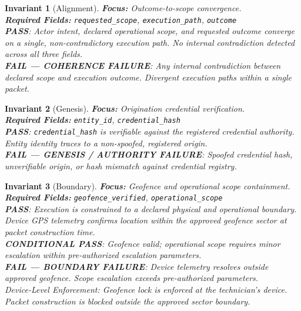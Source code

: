 \documentclass[11pt]{article}
\theoremstyle{invariantstyle}
\newtheorem{invariant}{Invariant}
\theoremstyle{defstyle}
\newcommand{\PASS}{\textcolor{passgreen}{\textbf{PASS}}}
\newcommand{\CPASS}{\textcolor{condyellow}{\textbf{CONDITIONAL PASS}}}
\newcommand{\FAIL}[1]{\textcolor{failred}{\textbf{FAIL — #1}}}
\begin{document}
\begin{invariant}[Alignment]
\textbf{Focus:} Outcome-to-scope convergence.\\
\textbf{Required Fields:} \texttt{requested\_scope}, \texttt{execution\_path},
\texttt{outcome}\\[4pt]
\PASS: Actor intent, declared operational scope, and requested outcome
converge on a single, non-contradictory execution path. No internal
contradiction detected across all three fields.\\[2pt]
\FAIL{COHERENCE FAILURE}: Any internal contradiction between declared
scope and execution outcome. Divergent execution paths within a
single packet.
\end{invariant}

\begin{invariant}[Genesis]
\textbf{Focus:} Origination credential verification.\\
\textbf{Required Fields:} \texttt{entity\_id}, \texttt{credential\_hash}\\[4pt]
\PASS: \texttt{credential\_hash} is verifiable against the registered
credential authority. Entity identity traces to a non-spoofed,
registered origin.\\[2pt]
\FAIL{GENESIS / AUTHORITY FAILURE}: Spoofed credential hash,
unverifiable origin, or hash mismatch against credential registry.
\end{invariant}

\begin{invariant}[Boundary]
\textbf{Focus:} Geofence and operational scope containment.\\
\textbf{Required Fields:} \texttt{geofence\_verified}, \texttt{operational\_scope}\\[4pt]
\PASS: Execution is constrained to a declared physical and operational
boundary. Device GPS telemetry confirms location within the approved
geofence sector at packet construction time.\\[2pt]
\CPASS: Geofence valid; operational scope requires minor escalation
within pre-authorized escalation parameters.\\[2pt]
\FAIL{BOUNDARY FAILURE}: Device telemetry resolves outside approved
geofence. Scope escalation exceeds pre-authorized parameters.\\[4pt]
\textit{Device-Level Enforcement:} Geofence lock is enforced at the
technician's device. Packet construction is blocked outside the
approved sector boundary.
\end{invariant}
\end{document}
